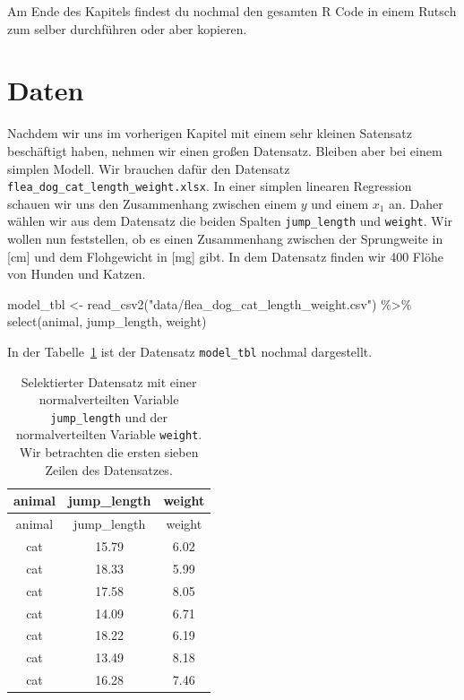 \documentclass[
  letterpaper,
]{scrbook}
\newenvironment{Shaded}{\begin{snugshade}}{\end{snugshade}}
\newcommand{\FunctionTok}[1]{\textcolor[rgb]{0.28,0.35,0.67}{#1}}
\newcommand{\NormalTok}[1]{\textcolor[rgb]{0.00,0.23,0.31}{#1}}
\newcommand{\OtherTok}[1]{\textcolor[rgb]{0.00,0.23,0.31}{#1}}
\newcommand{\SpecialCharTok}[1]{\textcolor[rgb]{0.37,0.37,0.37}{#1}}
\newcommand{\StringTok}[1]{\textcolor[rgb]{0.13,0.47,0.30}{#1}}
\begin{document}
Am Ende des Kapitels findest du nochmal den gesamten R Code in einem
Rutsch zum selber durchführen oder aber kopieren.

\hypertarget{daten-4}{%
\section{Daten}\label{daten-4}}

Nachdem wir uns im vorherigen Kapitel mit einem sehr kleinen Satensatz
beschäftigt haben, nehmen wir einen großen Datensatz. Bleiben aber bei
einem simplen Modell. Wir brauchen dafür den Datensatz
\texttt{flea\_dog\_cat\_length\_weight.xlsx}. In einer simplen linearen
Regression schauen wir uns den Zusammenhang zwischen einem \(y\) und
einem \(x_1\) an. Daher wählen wir aus dem Datensatz die beiden Spalten
\texttt{jump\_length} und \texttt{weight}. Wir wollen nun feststellen,
ob es einen Zusammenhang zwischen der Sprungweite in {[}cm{]} und dem
Flohgewicht in {[}mg{]} gibt. In dem Datensatz finden wir 400 Flöhe von
Hunden und Katzen.

\begin{Shaded}
\begin{Highlighting}[]
\NormalTok{model\_tbl }\OtherTok{\textless{}{-}} \FunctionTok{read\_csv2}\NormalTok{(}\StringTok{"data/flea\_dog\_cat\_length\_weight.csv"}\NormalTok{) }\SpecialCharTok{\%\textgreater{}\%}
  \FunctionTok{select}\NormalTok{(animal, jump\_length, weight)}
\end{Highlighting}
\end{Shaded}

In der Tabelle~\ref{tbl-model-1} ist der Datensatz \texttt{model\_tbl}
nochmal dargestellt.

\hypertarget{tbl-model-1}{}
\begin{longtable}[]{@{}ccc@{}}
\caption{\label{tbl-model-1}Selektierter Datensatz mit einer
normalverteilten Variable \texttt{jump\_length} und der normalverteilten
Variable \texttt{weight}. Wir betrachten die ersten sieben Zeilen des
Datensatzes.}\tabularnewline
\toprule()
animal & jump\_length & weight \\
\midrule()
\endfirsthead
\toprule()
animal & jump\_length & weight \\
\midrule()
\endhead
cat & 15.79 & 6.02 \\
cat & 18.33 & 5.99 \\
cat & 17.58 & 8.05 \\
cat & 14.09 & 6.71 \\
cat & 18.22 & 6.19 \\
cat & 13.49 & 8.18 \\
cat & 16.28 & 7.46 \\
\bottomrule()
\end{longtable}
\end{document}
